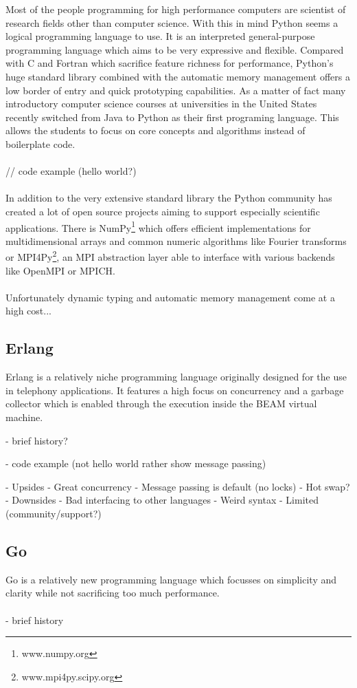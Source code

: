 Most of the people programming for high performance computers are scientist of research fields other than computer science. With this in mind Python seems a logical programming language to use. It is an interpreted general-purpose programming language which aims to be very expressive and flexible. Compared with C and Fortran which sacrifice feature richness for performance, Python's huge standard library combined with the automatic memory management offers a low border of entry and quick prototyping capabilities.
As a matter of fact many introductory computer science courses at universities in the United States recently switched from Java to Python as their first programing language.\autocite{GUO14} This allows the students to focus on core concepts and algorithms instead of boilerplate code.
\\ \\
// code example (hello world?)
\\ \\
In addition to the very extensive standard library the Python community has created a lot of open source projects aiming to support especially scientific applications. There is NumPy\footnote{www.numpy.org} which offers efficient implementations for multidimensional arrays and common numeric algorithms like Fourier transforms or MPI4Py\footnote{www.mpi4py.scipy.org}, an MPI abstraction layer able to interface with various backends like OpenMPI or MPICH.
\\ \\
Unfortunately dynamic typing and automatic memory management come at a high cost...

\subsection*{Erlang}
\label{ssec:Candidates.Erlang}
Erlang is a relatively niche programming language originally designed for the use in telephony applications. It features a high focus on concurrency and a garbage collector which is enabled through the execution inside the BEAM virtual machine.

- brief history?

- code example (not hello world rather show message passing)

- Upsides
    - Great concurrency
    - Message passing is default (no locks)
    - Hot swap?
- Downsides
    - Bad interfacing to other languages
    - Weird syntax
    - Limited (community/support?)


\subsection*{Go}
\label{ssec:Candidates.Go}
Go is a relatively new programming language which focusses on simplicity and clarity while not sacrificing too much performance.
\\ \\
- brief history

